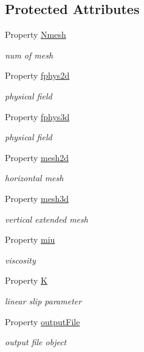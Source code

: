\subsection*{Protected Attributes}
\begin{DoxyCompactItemize}
\item 
Property \hyperlink{class_l_s_w_e3d_aa9ca3b8035860972759ada67bd3f44d2}{Nmesh}
\begin{DoxyCompactList}\small\item\em num of mesh \end{DoxyCompactList}\item 
Property \hyperlink{class_l_s_w_e3d_a041b98e0bcf7540ae293b75181698e7f}{fphys2d}
\begin{DoxyCompactList}\small\item\em physical field \end{DoxyCompactList}\item 
Property \hyperlink{class_l_s_w_e3d_a0de3e11488a76f7735c2381d48ac66d9}{fphys3d}
\begin{DoxyCompactList}\small\item\em physical field \end{DoxyCompactList}\item 
Property \hyperlink{class_l_s_w_e3d_abb000bf296c2d3b922ab524c93cc2b3f}{mesh2d}
\begin{DoxyCompactList}\small\item\em horizontal mesh \end{DoxyCompactList}\item 
Property \hyperlink{class_l_s_w_e3d_ab2a8fc06f55e023a64c987c456a5127b}{mesh3d}
\begin{DoxyCompactList}\small\item\em vertical extended mesh \end{DoxyCompactList}\item 
Property \hyperlink{class_l_s_w_e3d_a39ccfa5961ac6b3a899061f11124379b}{miu}
\begin{DoxyCompactList}\small\item\em viscosity \end{DoxyCompactList}\item 
Property \hyperlink{class_l_s_w_e3d_a467e775c28d9ef4e2e978d4599a79bc0}{K}
\begin{DoxyCompactList}\small\item\em linear slip parameter \end{DoxyCompactList}\item 
Property \hyperlink{class_l_s_w_e3d_ad7adc998480d20be459d3ae030bd1008}{output\+File}
\begin{DoxyCompactList}\small\item\em output file object \end{DoxyCompactList}\end{DoxyCompactItemize}


